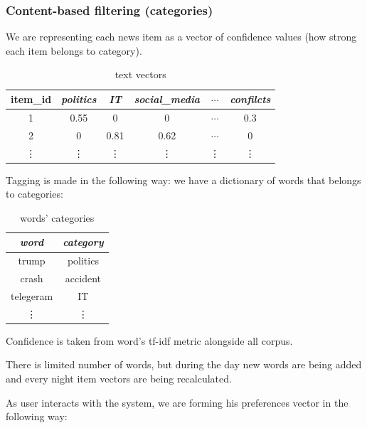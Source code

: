 \documentclass{article}
\begin{document}
\subsubsection{Content-based filtering (categories)}
\label{content}

We are representing each news item as a vector of confidence values (how strong each item belongs to category).

\begin{table}[h]
    \centering
    \begin{tabular}{cccccc}
        \toprule
        item\_id & \textit{politics} & \textit{IT} & \textit{social\_media} & $\cdots$ & \textit{confilcts} \\
        \midrule
        1 & 0.55 & 0 & 0 & $\cdots$ & 0.3 \\
        2 & 0    & 0.81  & 0.62 & $\cdots$ & 0 \\
        \vdots & \vdots & \vdots & \vdots & \vdots & \vdots\\

        \bottomrule
    \end{tabular}%
    \caption{text vectors}
    \label{tab:text_vectors}
\end{table}

Tagging is made in the following way: we have a dictionary of words that belongs to categories:

\begin{table}[h]
    \centering
    \begin{tabular}{cc}
        \toprule
        \textit{word} & \textit{category} \\
        \midrule
        trump & politics \\
        crash & accident \\
        telegeram & IT \\
        \vdots & \vdots \\
        \bottomrule
    \end{tabular}%
    \caption{words' categories}
    \label{tab:words_categories}
\end{table}

Confidence is taken from word's tf-idf metric alongside all corpus.

There is limited number of words, but during the day new words are being added and every night item vectors are being recalculated.

As user interacts with the system, we are forming his preferences vector in the following way:
\end{document}
